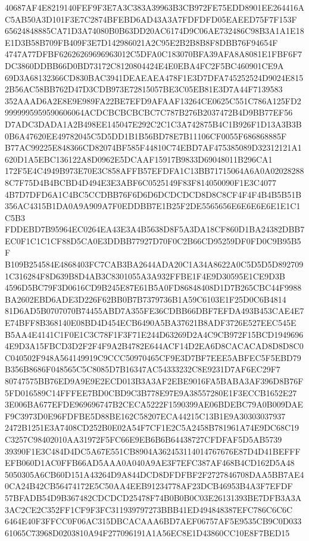 \documentclass[UTF8,fontset=fandol,zihao=-4,a4paper]{ctexart}
\begin{document}
{{40687AF4E8219140FEF9F3E7A3C383A39963B3CB972FE75EDD8901EE264416AC5AB50A3D101F3E7C2874BFEBD6AD43A3A7FDFDFD05EAEED75F7F153F
65624848885CA71D3A74080B0B63DD20AC6174D9C06AE732486C98B3A1A1E18E1D3B58B709FB409F3E7D142986021A2C95E2B2B8B8F8DBB76F94654F
4747A77DFBF62626269696963012C5DFA0C183070BFA39AFA8A8081E1FBF6F7DC3860DDBB66D0BD73172C8120804424E4E0EBA4FC2F5BC460901CE9A
69D3A68132366CD830BAC3941DEAEAEA478F1E3D7DFA745252524D9024E8152B56AC58BB762D47D3CDB973E72815057BE3C05EB81E3D7A44F7139583
352AAAD6A2E8E9E989FA22BE7EFD9AFAAF13264CE0625C551C786A125FD29999995959590606064ACDCBCBCBCBC7C787B276B2037472B4D9BB77EF56
D7ADC3DADA1A2B498EE145047E292C2C1C3A742875B4C1B926F1D13A3B3B0B6A47620EE49782045C5D5DD1B1B56BD78E7B11106CF0055F686868885F
B77AC99225E848366CD82074BF585F44810C74EBD7AF475385089D32312121A1620D1A5EBC136122A8D0962E5DCAAF15917B9833D69048011B296CA1
172F5E4C4949B973E70E3C858AFFB57EFDFA1C13BB71715064A6A0A020282888C7F75D4B4BCBD4D494E3E3ABF6C0525149F83F814050090F1E3C4077
4B7D7DFD6A1C4BC5CCDBB76F6D6D6DCDCDCD8D8C8CF4F4F4B4B5B51B356AC4315B1DA0A9A909A7F0EDDBB7E1B25F2DE5565656E6E6E6E6E1E1C1C5B3
FDDEBD7B95964EC0264EA43E3A4B5638D8F5A3DA18CF860D1BA24382DBB7EC0F1C1C1CF88D5CA0E3DDBB77927D70F0C2B66CD95259DF0FD0C9B95B5F
B109B254584E4868403FC7CAB3BA2644ADA20C1A34A8622A0C5D5D5D8927091C316284F8D639B8D4AB3C8301055A3A932FFBE1F4E9D30595E1CE9D3B
4596D5BC79F3D0616CD9B245E87E61B5A0FD86848408D1D7B265CBC44F9988BA2602EBD6ADE3D226F62BB0B7B7379736B1A59C6103E1F25D0C6B4814
81D6AD5B0707070B74455ABD7A355FE36CDBB66DBF7EFDA493B453CAE4E7E74BFF8B368140E08BD4D454ECB6490A5BA37621B8ADF3726E527EEC545E
B5AA4E4141C1F0E1C3C78F1F3F71E244D63269D2A4C9CB972F15BCD19496964E9D3A15FBCD3D2F2F4F9A2B4782E644ACF14D2EA6D8CACACAD8D8D8C0
C040502F948A564149919C9CCC50970465CF9E3D7BF7EEE5ABFEC5F5EBD79B356B8686F048565C5C8085D7B16347AC54333232C8E9231D7AF6EC29F7
80747575BB76ED9A9E9E2ECD013B3A3AF2EBE9016FA5BABA3AF396D8B76F5FD016589C14FFFEE7BD0CBD9C3B778E97E9A38557280E1F3ECCB1652E27
3E006BA677EFDE969696747B2CECA5222F1590399AE06BDEBC79A0B009DAEF9C3973D0E96FDFBE5D88BE162C58207ECA44215C13B1E9A30303037937
2472B1251E3A7408CD252B0E02A54F7CF1E2C5A2458B781961A74E9DC68C19C3257C98402010AA31972F5FC66E9EB6B6B64438727CFDFAF5D5AB5739
39390F1E3C484D4DC5A67E551CB8904A362453114014767676E87D4D41BEFFFEFB060D1AC0FFB66AD5AAA0A040A9AE3F7EFC387AF468B4CD162D5A48
5050305A6CB60D151A43264D9A844DCD8DFDFBF2F2727846708DAA5BB7AE40CA24B42CB56474172E5C50AA4EEB91234778AF23DCB46953B4A3F7EFDF
57BFADB54D9B367482CDCDCD25478F74B0B0B0C03E26131393BE7DFB3A3A3AC2CE2C352FF1CF9F3FC311939797273BBB41ED494848387EFC786C6C6C
6464E40F3FFCC0F06AC315DBCACAAA6BD7AEF06757AF5E9535CB9C0D03361065C73968D0203810A94F277096191A1A56EC8E1D43860CC10E8F7BED15
}}
\end{document}
